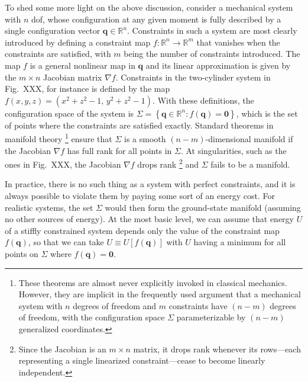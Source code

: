To shed some more light on the above discussion, consider a mechanical system with $n$ \ac{dof}, whose configuration at any given moment is fully described by a single configuration vector $\bm{q} \in \mathbb{R}^{n}$.
Constraints in such a system are most clearly introduced by defining a constraint map $f: \mathbb{R}^{n} \to \mathbb{R}^{m}$
that vanishes when the constraints are satisfied, with $m$ being the number of constraints introduced.
The map $f$ is a general nonlinear map in $\bm{q}$ and its linear approximation is given by the $m\times n$ Jacobian matrix $\nabla f$.
Constraints in the two-cylinder system in Fig.~XXX, for instance is defined by the map $f(x, y, z) = (x^{2} + z^{2} - 1,\, y^{2} + z^{2} - 1)$.
With these definitions, the configuration space of the system is $\Sigma = \left\{\bm{q} \in \mathbb{R}^{n} : f(\bm{q}) = \bm{0}\right\}$, which is the set of points where the constraints are satisfied exactly.
Standard theorems in manifold theory%
\footnote{These theorems are almost never explicitly invoked in classical mechanics.
However, they are implicit in the frequently used argument that a mechanical system with $n$ degrees of freedom and $m$ constraints have $(n-m)$ degrees of freedom, with the configuration space $\Sigma$ parameterizable by $(n-m)$ generalized coordinates.}
ensure that $\Sigma$ is a smooth $(n-m)$-dimensional manifold if the Jacobian $\nabla f$ has full rank for all points in $\Sigma$.
At singularities, such as the ones in Fig.~XXX, the Jacobian $\nabla f$ drops rank%
\footnote{Since the Jacobian is an $m\times n$ matrix, it drops rank whenever its rows---each representing a single linearized constraint---cease to become linearly independent.}
and $\Sigma$ fails to be a manifold.

In practice, there is no such thing as a system with perfect constraints, and it is always possible to violate them by paying some sort of an energy cost.
For realistic systems, the set $\Sigma$ would then form the ground-state manifold (assuming no other sources of energy).
At the most basic level, we can assume that energy $U$ of a stiffly constrained system depends only the value of the constraint map $f(\bm{q})$, so that we can take $U \equiv U[f(\bm{q})]$ with $U$ having a minimum for all points on $\Sigma$ where $f(\bm{q}) = \bm{0}$.


